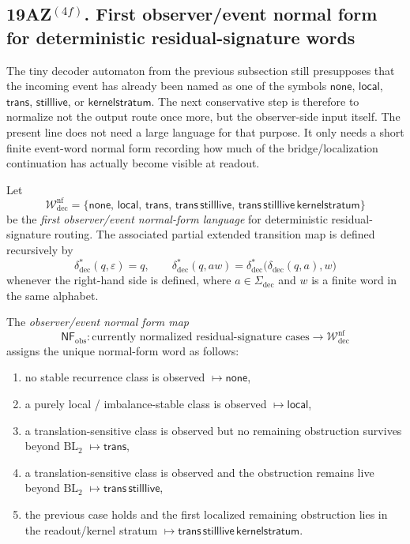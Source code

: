 \subsection*{19AZ$^{(4f)}$. First observer/event normal form for deterministic residual-signature words}
\label{sec:first-observer-event-normal-form-deterministic-residual-signature-words}
The tiny decoder automaton from the previous subsection still presupposes that the incoming event has already been named as one of the symbols \(\mathsf{none}\), \(\mathsf{local}\), \(\mathsf{trans}\), \(\mathsf{stilllive}\), or \(\mathsf{kernelstratum}\). The next conservative step is therefore to normalize not the output route once more, but the observer-side input itself. The present line does not need a large language for that purpose. It only needs a short finite event-word normal form recording how much of the bridge/localization continuation has actually become visible at readout.

\begin{definition}
\label{def:first-observer-event-normal-form-deterministic-residual-signature-words}
Let
\[
\mathcal W^{\mathrm{nf}}_{\mathrm{dec}}
=
\bigl\{
\mathsf{none},\,
\mathsf{local},\,
\mathsf{trans},\,
\mathsf{trans}\,\mathsf{stilllive},\,
\mathsf{trans}\,\mathsf{stilllive}\,\mathsf{kernelstratum}
\bigr\}
\]
be the \emph{first observer/event normal-form language} for deterministic residual-signature routing. The associated partial extended transition map is defined recursively by
\[
\delta^{\ast}_{\mathrm{dec}}(q,\varepsilon)=q,
\qquad
\delta^{\ast}_{\mathrm{dec}}(q,aw)=
\delta^{\ast}_{\mathrm{dec}}\bigl(\delta_{\mathrm{dec}}(q,a),w\bigr)
\]
whenever the right-hand side is defined, where \(a\in\Sigma_{\mathrm{dec}}\) and \(w\) is a finite word in the same alphabet.

The \emph{observer/event normal form map}
\[
\mathsf{NF}_{\mathrm{obs}}: \text{currently normalized residual-signature cases}
\longrightarrow \mathcal W^{\mathrm{nf}}_{\mathrm{dec}}
\]
assigns the unique normal-form word as follows:
\begin{enumerate}[label=(\roman*)]
    \item no stable recurrence class is observed \(\mapsto \mathsf{none}\),
    \item a purely local / imbalance-stable class is observed \(\mapsto \mathsf{local}\),
    \item a translation-sensitive class is observed but no remaining obstruction survives beyond \(\mathrm{BL}_2\) \(\mapsto \mathsf{trans}\),
    \item a translation-sensitive class is observed and the obstruction remains live beyond \(\mathrm{BL}_2\) \(\mapsto \mathsf{trans}\,\mathsf{stilllive}\),
    \item the previous case holds and the first localized remaining obstruction lies in the readout/kernel stratum \(\mapsto \mathsf{trans}\,\mathsf{stilllive}\,\mathsf{kernelstratum}\).
\end{enumerate}
\end{definition}

